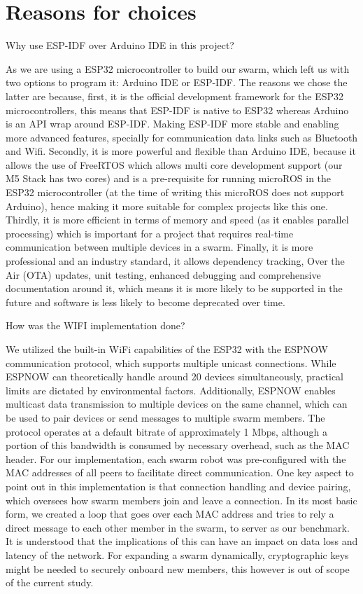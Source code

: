 \documentclass[conference]{IEEEtran}
\begin{document}
\section{Reasons for choices}
Why use ESP-IDF over Arduino IDE in this project? \cite{esp-boards_esp-idf_nodate}\cite{expressif_freertos_nodate}

As we are using a ESP32 microcontroller to build our swarm, which left us with two options to program it: Arduino IDE or ESP-IDF. The reasons we chose the latter are because, first, it is the official development framework for the ESP32 microcontrollers, this means that ESP-IDF is native to ESP32 whereas Arduino is an API wrap around ESP-IDF. Making ESP-IDF more stable and enabling more advanced features, specially for communication data links such as Bluetooth and Wifi. Secondly, it is more powerful and flexible than Arduino IDE, because it allows the use of FreeRTOS which allows multi core development support (our M5 Stack has two cores) and is a pre-requisite for running microROS in the ESP32 microcontroller (at the time of writing this microROS does not support Arduino), hence making it more suitable for complex projects like this one. Thirdly, it is more efficient in terms of memory and speed (as it enables parallel processing) which is important for a project that requires real-time communication between multiple devices in a swarm. Finally, it is more professional and an industry standard, it allows dependency tracking, Over the Air (OTA) updates, unit testing, enhanced debugging and comprehensive documentation around it, which means it is more likely to be supported in the future and software is less likely to become deprecated over time.

How was the WIFI implementation done?

We utilized the built-in WiFi capabilities of the ESP32 with the ESPNOW communication protocol, which supports multiple unicast connections. While ESPNOW can theoretically handle around 20 devices simultaneously, practical limits are dictated by environmental factors. Additionally, ESPNOW enables multicast data transmission to multiple devices on the same channel, which can be used to pair devices or send messages to multiple swarm members. The protocol operates at a default bitrate of approximately 1 Mbps, although a portion of this bandwidth is consumed by necessary overhead, such as the MAC header. For our implementation, each swarm robot was pre-configured with the MAC addresses of all peers to facilitate direct communication. %
One key aspect to point out in this implementation is that connection handling and device pairing, which oversees how swarm members join and leave a connection. In its most basic form, we created a loop that goes over each MAC address and tries to rely a direct message to each other member in the swarm, to server as our benchmark. It is understood that the implications of this can have an impact on data loss and latency of the network.
For expanding a swarm dynamically, cryptographic keys might be needed to securely onboard new members, this however is out of scope of the current study.
\end{document}
